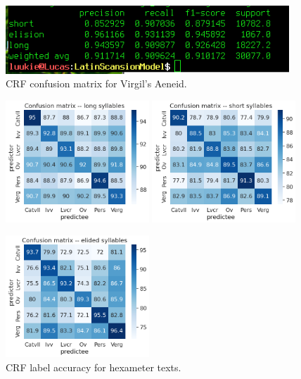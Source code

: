 \begin{figure}[H]
    \centering
    \includegraphics[width=0.95\textwidth]{img/crf/crf_confusion_matrix.png}

    \caption{CRF confusion matrix for Virgil's Aeneid.}
    \label{fig:exp_architecture}
\end{figure}

\newpage

\begin{figure}[H]
    \centering
    \includegraphics[width=0.48\textwidth]{img/crf/crf_label_accuracy_long.png}
    \quad
    \includegraphics[width=0.48\textwidth]{img/crf/crf_label_accuracy_short.png}

    \includegraphics[width=0.48\textwidth]{img/crf/crf_label_accuracy_elision.png}

    \caption{CRF label accuracy for hexameter texts.}
    \label{fig:exp_architecture}
\end{figure}

